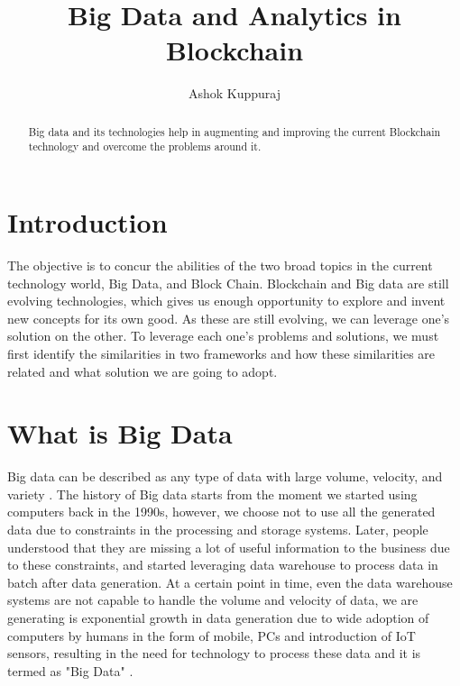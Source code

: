\documentclass[sigconf]{acmart}
\begin{document}
\title{Big Data and Analytics in Blockchain}


\author{Ashok Kuppuraj}


\renewcommand{\shortauthors}{G. v. Laszewski}


\begin{abstract}
Big data and its technologies help in augmenting and improving the current Blockchain technology and overcome the problems around it.
\end{abstract}



\maketitle


\section{Introduction}
The objective is to concur the abilities of the two broad topics in the current technology world, Big Data, and Block Chain. Blockchain and Big data are still evolving technologies, which gives us enough opportunity to explore and invent new concepts for its own good. As these are still evolving, we can leverage one’s solution on the other. To leverage each one’s problems and solutions, we must first identify the similarities in two frameworks and how these similarities are related and what solution we are going to adopt.


\section{What is Big Data}

Big data can be described as any type of data with large volume, velocity, and variety \cite{vvv:online}. The history of Big data starts from the moment we started using computers back in the 1990s, however, we choose not to use all the generated data due to constraints in the processing and storage systems. Later, people understood that they are missing a lot of useful information to the business due to these constraints, and started leveraging data warehouse to process data in batch after data generation. At a certain point in time, even the data warehouse systems are not capable to handle the
volume and velocity of data, we are generating\cite{Bigdataintro} is exponential growth in data generation due to wide adoption of computers by humans in the form of mobile, PCs and introduction of IoT sensors, resulting in the need for technology to process these data and it is termed as "Big Data" \cite{datagrowth}.
\end{document}

